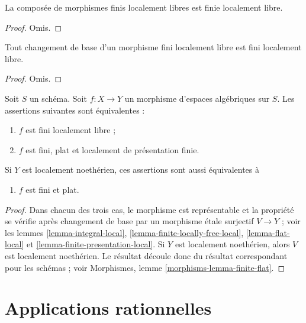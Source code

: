 \begin{lemma}
\label{lemma-composition-finite-locally-free}
La composée de morphismes finis localement libres est finie localement libre.
\end{lemma}

\begin{proof}
Omis.
\end{proof}

\begin{lemma}
\label{lemma-base-change-finite-locally-free}
Tout changement de base d'un morphisme fini localement libre est fini localement libre.
\end{lemma}

\begin{proof}
Omis.
\end{proof}

\begin{lemma}
\label{lemma-finite-flat}
Soit $S$ un schéma.
Soit $f : X \to Y$ un morphisme d'espaces algébriques sur $S$.
Les assertions suivantes sont équivalentes :
\begin{enumerate}
\item $f$ est fini localement libre ;
\item $f$ est fini, plat et localement de présentation finie.
\end{enumerate}
Si $Y$ est localement noethérien, ces assertions sont aussi équivalentes à
\begin{enumerate}
\item[(3)] $f$ est fini et plat.
\end{enumerate}
\end{lemma}

\begin{proof}
Dans chacun des trois cas, le morphisme est représentable et la propriété
se vérifie après changement de base par un morphisme étale surjectif
$V \to Y$ ; voir les
lemmes \ref{lemma-integral-local},
\ref{lemma-finite-locally-free-local},
\ref{lemma-flat-local} et
\ref{lemma-finite-presentation-local}.
Si $Y$ est localement noethérien, alors $V$ est localement noethérien.
Le résultat découle donc du résultat correspondant
pour les schémas ; voir
Morphismes, lemme \ref{morphisms-lemma-finite-flat}.
\end{proof}





\section{Applications rationnelles}
\label{section-rational-maps}

